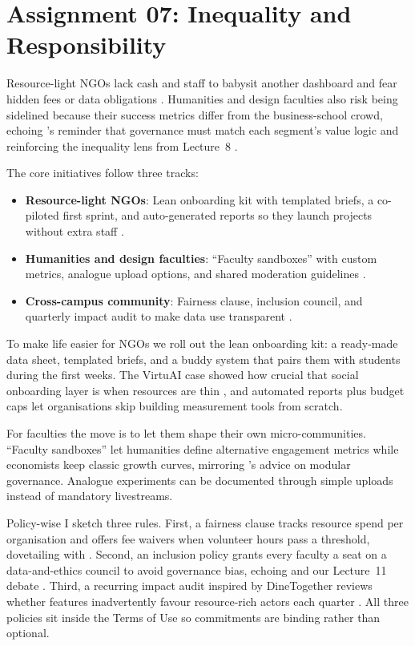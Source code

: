 \section*{Assignment 07: Inequality and Responsibility}

Resource-light NGOs lack cash and staff to babysit another dashboard and fear hidden fees or data obligations \citep{Srnicek2017}. Humanities and design faculties also risk being sidelined because their success metrics differ from the business-school crowd, echoing \citet{Choudary2016}'s reminder that governance must match each segment’s value logic and reinforcing the inequality lens from Lecture~8 \citep{Lecture08}.

The core initiatives follow three tracks:
\begin{itemize}
  \item \textbf{Resource-light NGOs}: Lean onboarding kit with templated briefs, a co-piloted first sprint, and auto-generated reports so they launch projects without extra staff \citep{Gunasilan2024}.
  \item \textbf{Humanities and design faculties}: ``Faculty sandboxes'' with custom metrics, analogue upload options, and shared moderation guidelines \citep{Reillier2017}.
  \item \textbf{Cross-campus community}: Fairness clause, inclusion council, and quarterly impact audit to make data use transparent \citep{ShapiroVarian1999,Rennella2023}.
\end{itemize}

To make life easier for NGOs we roll out the lean onboarding kit: a ready-made data sheet, templated briefs, and a buddy system that pairs them with students during the first weeks. The VirtuAI case showed how crucial that social onboarding layer is when resources are thin \citep{Gunasilan2024}, and automated reports plus budget caps let organisations skip building measurement tools from scratch.

For faculties the move is to let them shape their own micro-communities. ``Faculty sandboxes'' let humanities define alternative engagement metrics while economists keep classic growth curves, mirroring \citet{Reillier2017}'s advice on modular governance. Analogue experiments can be documented through simple uploads instead of mandatory livestreams.

Policy-wise I sketch three rules. First, a fairness clause tracks resource spend per organisation and offers fee waivers when volunteer hours pass a threshold, dovetailing with \citet{ShapiroVarian1999}. Second, an inclusion policy grants every faculty a seat on a data-and-ethics council to avoid governance bias, echoing \citet{Zuboff2019} and our Lecture~11 debate \citep{Lecture11}. Third, a recurring impact audit inspired by DineTogether reviews whether features inadvertently favour resource-rich actors each quarter \citep{Rennella2023}. All three policies sit inside the Terms of Use so commitments are binding rather than optional.

